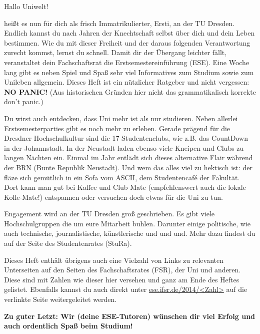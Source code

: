 
Hallo Uniwelt!

heißt es nun für dich als frisch Immatrikulierter, Ersti, an der TU Dresden. 
Endlich kannst du nach Jahren der Knechtschaft selbst über dich und dein Leben bestimmen. 
Wie du mit dieser Freiheit und der daraus folgenden Verantwortung zurecht kommst, lernst du schnell. 
Damit dir der Übergang leichter fällt, veranstaltet dein Fachschaftsrat die Erstsemestereinführung (ESE). 
Eine Woche lang gibt es neben Spiel und Spaß sehr viel Informatives zum Studium sowie zum Unileben allgemein. 
Dieses Heft ist ein nützlicher Ratgeber und nicht vergessen: 
\textbf{NO PANIC!} (Aus historischen Gründen hier nicht das grammatikalisch korrekte \glqq don't panic\grqq.)

Du wirst auch entdecken, dass Uni mehr ist als nur studieren. 
Neben allerlei Erstsemesterparties gibt es noch mehr zu erleben. 
Gerade prägend für die Dresdner Hochschulkultur sind die 17 Studentenclubs, wie z.B. das CountDown in der Johannstadt. 
In der Neustadt laden ebenso viele Kneipen und Clubs zu langen Nächten ein. 
Einmal im Jahr entlädt sich dieses alternative Flair während der BRN (Bunte Republik Neustadt). 
Und wem das alles viel zu hektisch ist: der fläze sich gemütlich in ein Sofa vom ASCII, dem Studentencafé der Fakultät. 
Dort kann man gut bei Kaffee und Club Mate (empfehlenswert auch die lokale Kolle-Mate!) entspannen oder versuchen doch etwas für die Uni zu tun.

Engagement wird an der TU Dresden groß geschrieben. 
Es gibt viele Hochschulgruppen die um eure Mitarbeit buhlen. 
Darunter einige politische, wie auch technische, journalistische, künstlerische und und und. Mehr dazu findest du auf der Seite des Studentenrates (StuRa).

Dieses Heft enthält übrigens auch eine Vielzahl von Links zu relevanten Unterseiten auf den Seiten des Fachschaftsrates (FSR), der Uni und anderen. 
Diese sind mit Zahlen wie dieser hier  versehen und ganz am Ende des Heftes gelistet. Ebenfalls kannst du auch direkt unter \url{ese.ifsr.de/2014/<Zahl>} auf die verlinkte Seite weitergeleitet werden.

\textbf{Zu guter Letzt: Wir (deine ESE-Tutoren) wünschen dir viel Erfolg und auch ordentlich Spaß beim Studium!}
